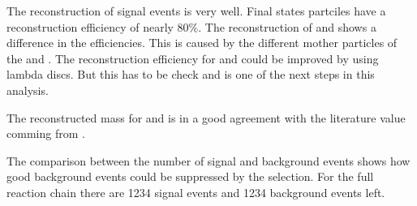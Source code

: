 The reconstruction of signal events is very well.
Final states partciles have a reconstruction efficiency of nearly $80\%$.
The reconstruction of \lam and \alam shows a difference in the efficiencies.
This is caused by the different mother particles of the \lam and \alam. 
The reconstruction efficiency for \lam and \alam could be improved by using lambda discs.
But this has to be check and is one of the next steps in this analysis.


The reconstructed mass for \excitedcascade and \excitedanticascade is in a good agreement with the literature value comming from \cite{PDG}.

The comparison between the number of signal and background events shows how good background events could be suppressed by the selection. 
For the full reaction chain there are 1234 signal events and 1234 background events left. 


